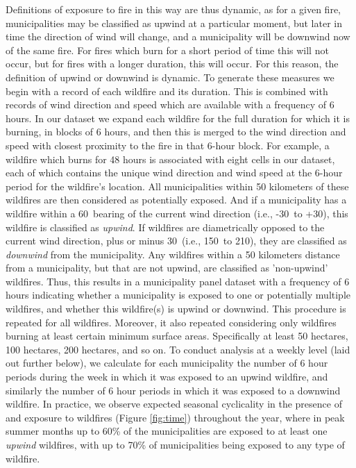 \documentclass[11pt]{article}
\begin{document}
\begin{spacing}{1.3}
Definitions of exposure to fire in this way are thus dynamic, as for a given fire, municipalities may be classified as upwind at a particular moment, but later in time the direction of wind will change, and a municipality will be downwind now of the same fire.  For fires which burn for a short period of time this will not occur, but for fires with a longer duration, this will occur.  For this reason, the definition of upwind or downwind is dynamic.  To generate these measures we begin with a record of each wildfire and its duration.  This is combined with records of wind direction and speed which are available with a frequency of 6 hours. In our dataset we expand each wildfire for the full duration for which it is burning, in blocks of 6 hours, and then this is merged to the wind direction and speed with closest proximity to the fire in that 6-hour block.  For example, a wildfire which burns for 48 hours is associated with eight cells in our dataset, each of which contains the unique wind direction and wind speed at the 6-hour period for the wildfire's location.  All municipalities within 50 kilometers of these wildfires are then considered as potentially exposed. And if a municipality has a wildfire within a 60\textdegree\ bearing of the current wind direction (i.e., -30\textdegree\ to +30\textdegree), this wildfire is classified as \textit{upwind}.  If wildfires are diametrically opposed to the current wind direction, plus or minus 30\textdegree\ (i.e., 150\textdegree\ to 210\textdegree), they are classified as \textit{downwind} from the municipality.  Any wildfires within a 50 kilometers distance from a municipality,  but that are not upwind, are classified as 'non-upwind' wildfires.  Thus, this results in a municipality panel dataset with a frequency of 6 hours indicating whether a municipality is exposed to one or potentially multiple wildfires, and whether this wildfire(s) is upwind or downwind.  This procedure is repeated for all wildfires. Moreover, it also repeated considering only wildfires burning at least certain minimum surface areas. Specifically at least 50 hectares, 100 hectares, 200 hectares, and so on.  To conduct analysis at a weekly level (laid out further below), we calculate for each municipality the number of 6 hour periods during the week in which it was exposed to an upwind wildfire, and similarly the number of 6 hour periods in which it was exposed to a downwind wildfire.  In practice, we observe expected seasonal cyclicality in the presence of and exposure to wildfires (Figure \ref{fig:time}) throughout the year, where in peak summer months up to 60\% of the municipalities are exposed to at least one \textit{upwind} wildfires, with up to 70\% of municipalities being exposed to any type of wildfire. 



\end{spacing}
\end{document}

